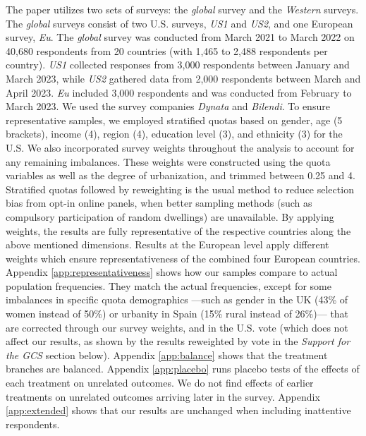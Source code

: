 \documentclass[12pt,english]{article}
\begin{document}
\begin{bibunit}
\begin{small}
The paper utilizes two sets of surveys: the \textit{global} survey and the \textit{Western} surveys. The \textit{global} surveys consist of two U.S. surveys, \textit{US1} and \textit{US2}, and one European survey, \textit{Eu}. The \textit{global} survey was conducted from March 2021 to March 2022 on 40,680 respondents from 20 countries (with 1,465 to 2,488 respondents per country). \textit{US1} collected responses from 3,000 respondents between January and March 2023, while \textit{US2} gathered data from 2,000 respondents between March and April 2023. \textit{Eu} included 3,000 respondents and was conducted from February to March 2023. We used the survey companies \emph{Dynata} and \emph{Bilendi}. To ensure representative samples, we employed stratified quotas based on gender, age (5 brackets), income (4), region (4), education level (3), and ethnicity (3) for the U.S. We also incorporated survey weights throughout the analysis to account for any remaining imbalances. These weights were constructed using the quota variables as well as the degree of urbanization, and trimmed between 0.25 and 4. Stratified quotas followed by reweighting is the usual method to reduce selection bias from opt-in online panels, when better sampling methods (such as compulsory participation of random dwellings) are unavailable.\cite{scherpenzeel_how_2010} By applying weights, the results are fully representative of the respective countries along the above mentioned dimensions. %
Results at the European level apply different weights which ensure  representativeness of the combined four European countries. Appendix \ref{app:representativeness} shows how our samples compare to actual population frequencies. They match the actual frequencies, except for some imbalances in specific quota demographics ---such as gender in the UK (43\% of women instead of 50\%) or urbanity in Spain (15\% rural instead of 26\%)--- that are corrected through our survey weights, and in the U.S. vote (which does not affect our results, as shown by the results reweighted by vote in the \textit{Support for the GCS} section below). 
Appendix \ref{app:balance} shows that the treatment branches are balanced. Appendix \ref{app:placebo} runs placebo tests of the effects of each treatment on unrelated outcomes. We do not find effects of earlier treatments on unrelated outcomes arriving later in the survey. Appendix \ref{app:extended} shows that our results are unchanged when including inattentive respondents.



\end{small}
\end{bibunit}
\end{document}
